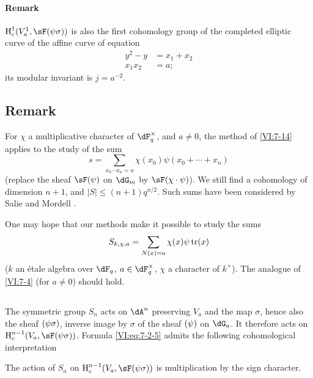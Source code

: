 \paragraph{Remark}

$\h_c^1(V_a^1,\sF(\psi\sigma))$ is also the first cohomology group of
the completed elliptic curve of the affine curve of equation 
\begin{align*}
  y^2-y &= x_1+x_2 \\
  x_1 x_2 &= a \text{;} 
\end{align*}
its modular invariant is $j=a^{-2}$. 





\subsection{Remark}\label{VI:7-18}

For $\chi$ a multiplicative character of $\dF_q^\times$, and $a\ne 0$, the
method of \ref{VI:7-14} applies to the study of the sum
\[
  s = \sum_{x_0\dotsm x_n = a} \chi(x_0) \psi(x_0+\cdots + x_n)
\]
(replace the sheaf $\sF(\psi)$ on $\dG_m$ by $\sF(\chi\cdot \psi)$). We
still find a cohomology of dimension $n+1$, and
$|S|\leqslant (n+1)q^{n/2}$. Such sums have been considered by
Salie and Mordell \cite{mo73}.

One may hope that our methods make it possible to study the sums
\[
  S_{k,\chi,a} = \sum_{N(x)=a} \chi(x) \psi \operatorname{tr}(x)
\]
($k$ an étale algebra over $\dF_q$, $a\in \dF_q^\times$, $\chi$ a character of
$k^\times$). The analogue of \ref{VI:7-4} (for $a\ne 0$) should hold. 





\subsection{}\label{VI:7-19}

The symmetric group $S_n$ acts on $\dA^n$ preserving $V_a$ and
the map $\sigma$, hence also the sheaf $\sf(\psi\sigma)$, inverse
image by $\sigma$ of the sheaf $\sf(\psi)$ on $\dG_a$. It therefore acts
on $\h_c^{n-1}(V_a,\sF(\psi\sigma))$. Formula \eqref{VI:eq:7-2-5} admits
the following cohomological interpretation





\begin{proposition_}\label{VI:7-20}
The action of $S_n$ on $\h_c^{n-1}(V_a,\sF(\psi\sigma))$ is multiplication
by the sign character.
\end{proposition_}

